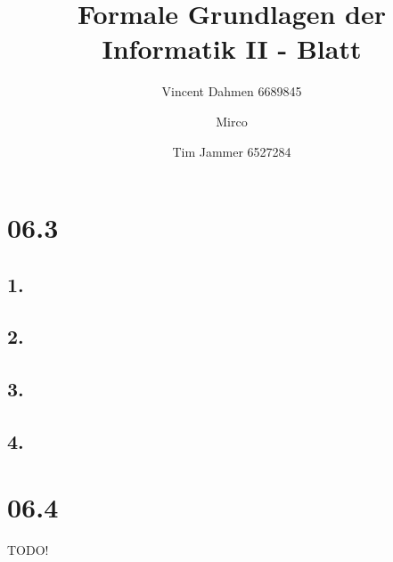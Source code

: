 \documentclass[12pt,a4paper]{article}
\title{Formale Grundlagen der Informatik II - Blatt \blattNr}
\author{Vincent Dahmen 6689845  \and Mirco \and Tim Jammer 6527284}
\def \blattNr{06}
\begin{document}
\maketitle{}

\section*{\blattNr .3}
\subsection*{1.}


\subsection*{2.}


\subsection*{3.}


\subsection*{4.}


%

\pagebreak

\section*{\blattNr .4}
TODO!
%
%
%
%
%
%
%
%
%
%
%
%
\end{document}
